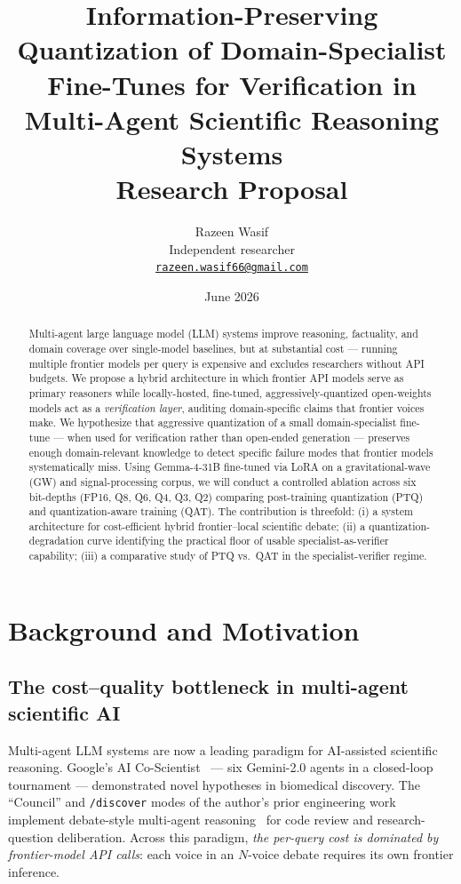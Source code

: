 \documentclass[11pt]{article}
\title{\bfseries Information-Preserving Quantization of Domain-Specialist Fine-Tunes for Verification in Multi-Agent Scientific Reasoning Systems\\[0.3em]\large Research Proposal}
\author{Razeen Wasif\\\small Independent researcher\\\small \href{mailto:razeen.wasif66@gmail.com}{\nolinkurl{razeen.wasif66@gmail.com}}}
\date{June 2026}
\begin{document}
\maketitle

\begin{abstract}
\noindent Multi-agent large language model (LLM) systems improve reasoning, factuality, and domain coverage over single-model baselines, but at substantial cost — running multiple frontier models per query is expensive and excludes researchers without API budgets. We propose a hybrid architecture in which frontier API models serve as primary reasoners while locally-hosted, fine-tuned, aggressively-quantized open-weights models act as a \emph{verification layer}, auditing domain-specific claims that frontier voices make. We hypothesize that aggressive quantization of a small domain-specialist fine-tune --- when used for verification rather than open-ended generation --- preserves enough domain-relevant knowledge to detect specific failure modes that frontier models systematically miss. Using Gemma-4-31B fine-tuned via LoRA on a gravitational-wave (GW) and signal-processing corpus, we will conduct a controlled ablation across six bit-depths (FP16, Q8, Q6, Q4, Q3, Q2) comparing post-training quantization (PTQ) and quantization-aware training (QAT). The contribution is threefold: (i) a system architecture for cost-efficient hybrid frontier--local scientific debate; (ii) a quantization-degradation curve identifying the practical floor of usable specialist-as-verifier capability; (iii) a comparative study of PTQ vs.\ QAT in the specialist-verifier regime.
\end{abstract}

\section{Background and Motivation}

\subsection{The cost--quality bottleneck in multi-agent scientific AI}

Multi-agent LLM systems are now a leading paradigm for AI-assisted scientific reasoning. Google's AI Co-Scientist~\cite{gottweis2025coscientist} --- six Gemini-2.0 agents in a closed-loop tournament --- demonstrated novel hypotheses in biomedical discovery. The ``Council'' and \texttt{/discover} modes of the author's prior engineering work implement debate-style multi-agent reasoning~\cite{du2023multiagent,wu2023autogen,hong2023metagpt} for code review and research-question deliberation. Across this paradigm, \emph{the per-query cost is dominated by frontier-model API calls}: each voice in an $N$-voice debate requires its own frontier inference.
\end{document}
